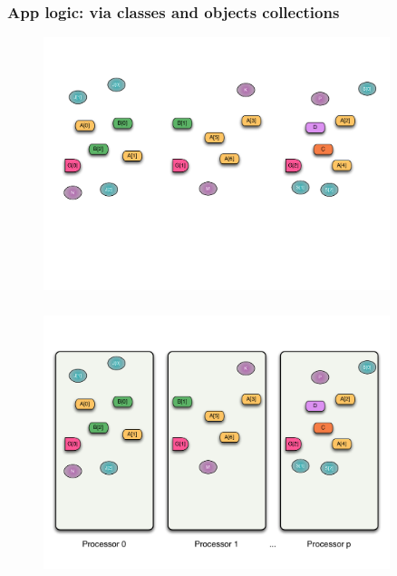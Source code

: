 \begin{frame}
  \frametitle{App logic: via classes and objects collections}
  \begin{figure}\includegraphics[width=0.9\textwidth]{../figures/progmodel/05-parallelism-via-obj-collections.pdf}\end{figure}
\end{frame}


\begin{frame}
  \frametitle{
  }
  \begin{figure}\includegraphics[width=0.9\textwidth]{../figures/progmodel/06-objects-sys-view.pdf}\end{figure}
\end{frame}



